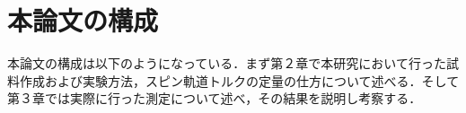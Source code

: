 \section{本論文の構成}
本論文の構成は以下のようになっている．まず第２章で本研究において行った試料作成および実験方法，スピン軌道トルクの定量の仕方について述べる．そして第３章では実際に行った測定について述べ，その結果を説明し考察する．




